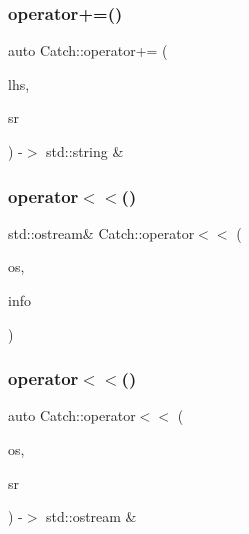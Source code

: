 \mbox{\label{namespace_catch_a61711bc909f8dc76d8b3deccc1440f46}} 
\subsubsection{operator+=()}
{\footnotesize\ttfamily auto Catch\+::operator+= (\begin{DoxyParamCaption}\item[{std\+::string \&}]{lhs,  }\item[{\textbf{ String\+Ref} const \&}]{sr }\end{DoxyParamCaption}) -\/$>$  std\+::string \&}

\mbox{\label{namespace_catch_a6ec18b5054d7fdfdde861c580b082995}} 
\subsubsection{operator$<$$<$()\hspace{0.1cm}{\footnotesize\ttfamily [1/2]}}
{\footnotesize\ttfamily std\+::ostream\& Catch\+::operator$<$$<$ (\begin{DoxyParamCaption}\item[{std\+::ostream \&}]{os,  }\item[{\textbf{ Source\+Line\+Info} const \&}]{info }\end{DoxyParamCaption})}

\mbox{\label{namespace_catch_a5e37b333d756a28e12d44977f063af43}} 
\subsubsection{operator$<$$<$()\hspace{0.1cm}{\footnotesize\ttfamily [2/2]}}
{\footnotesize\ttfamily auto Catch\+::operator$<$$<$ (\begin{DoxyParamCaption}\item[{std\+::ostream \&}]{os,  }\item[{\textbf{ String\+Ref} const \&}]{sr }\end{DoxyParamCaption}) -\/$>$  std\+::ostream \&}

\mbox{\label{namespace_catch_ab32a083e442cc09f736327d2e2865999}} 
